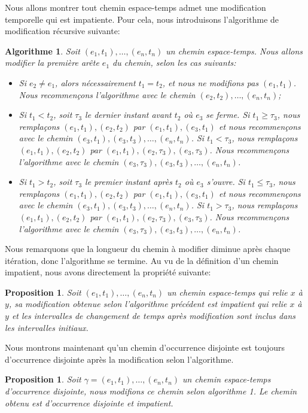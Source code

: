 \documentclass[titlepage,a4paper,12pt]{article}
\newcounter{d}
\newcounter{t}
\newcounter{p}
\newcounter{c}
\newcounter{a}
\newcounter{l}
\newtheorem{prop}[p]{Proposition}
\newtheorem{algo}[a]{Algorithme}
\begin{document}
Nous allons montrer tout chemin espace-temps admet une modification temporelle qui est impatiente. Pour cela, nous introduisons l'algorithme de modification récursive suivante:
\begin{algo} Soit $(e_1,t_1),\dots,(e_n,t_n)$ un chemin espace-temps. Nous allons modifier la première arête $e_1$ du chemin, selon les cas suivants:
\begin{itemize}[label = $\bullet$, leftmargin = *]
\item Si $e_2 \neq e_1$, alors nécessairement $t_1 = t_2$, et nous ne modifions pas $(e_1,t_1)$. Nous recommençons l'algorithme avec le chemin $(e_2,t_2),\dots,(e_n,t_n)$;
\item  Si $t_1< t_2$, soit $\tau_3$ le dernier instant avant $t_2$ où $e_{3}$ se ferme. Si $t_1 \geqslant \tau_3$, nous remplaçons $(e_1,t_1),(e_2,t_2)$ par $(e_1,t_1),(e_3,t_1)$ et nous recommençons avec le chemin $(e_3,t_1),(e_3,t_3),\dots, (e_n,t_n)$. Si $t_1 < \tau_3$, nous remplaçons $(e_1,t_1),(e_2,t_2)$ par $(e_1,t_1),(e_2,\tau_3),(e_3,\tau_3)$. Nous recommençons l'algorithme avec le chemin $(e_3,\tau_3),(e_3,t_3),\dots,(e_n,t_n)$.
\item Si $t_1 > t_2$, soit $\tau_3$ le premier instant après $t_2$ où $e_{3}$ s'ouvre. Si $t_1 \leqslant \tau_3$, nous remplaçons $(e_1,t_1),(e_2,t_2)$ par $(e_1,t_1),(e_3,t_1)$ et nous recommençons avec le chemin $(e_3,t_1),(e_3,t_3),\dots, (e_n,t_n)$. Si $t_1 > \tau_3$, nous remplaçons $(e_1,t_1),(e_2,t_2)$ par $(e_1,t_1),(e_2,\tau_3),(e_3,\tau_3)$. Nous recommençons l'algorithme avec le chemin $(e_3,\tau_3),(e_3,t_3),\dots,(e_n,t_n)$.
\end{itemize}
\end{algo}
Nous remarquons que la longueur du chemin à modifier diminue après chaque itération, donc l'algorithme se termine. Au vu de la définition d'un chemin impatient, nous avons directement la propriété suivante:
\begin{prop}
Soit $(e_1,t_1),\dots,(e_n,t_n)$ un chemin espace-temps qui relie $x$ à $y$, sa modification obtenue selon l'algorithme précédent est impatient qui relie $x$ à $y$ et les intervalles de changement de temps après modification sont inclus dans les intervalles initiaux.
\end{prop}
Nous montrons maintenant qu'un chemin d'occurrence disjointe est toujours d'occurrence disjointe après la modification selon l'algorithme.
\begin{prop} Soit $\gamma = (e_1,t_1),\dots,(e_n,t_n)$ un chemin espace-temps d'occurrence disjointe, nous modifions ce chemin selon algorithme 1. Le chemin obtenu est d'occurrence disjointe et impatient.
\end{prop}
\end{document}
